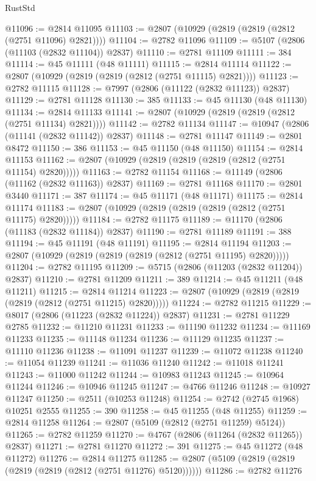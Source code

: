 \begin{lexlean}{RustStd}
\begin{coremodule}
@11096 := @2814 @11095
@11103 := @2807 (@10929 (@2819 (@2819 (@2812 (@2751 @11096) @2821))))
@11104 := @2782 @11096
@11109 := @5107 (@2806 (@11103 (@2832 @11104)) @2837)
@11110 := @2781 @11109
@11111 := 384
@11114 := @45 @11111 (@48 @11111)
@11115 := @2814 @11114
@11122 := @2807 (@10929 (@2819 (@2819 (@2812 (@2751 @11115) @2821))))
@11123 := @2782 @11115
@11128 := @7997 (@2806 (@11122 (@2832 @11123)) @2837)
@11129 := @2781 @11128
@11130 := 385
@11133 := @45 @11130 (@48 @11130)
@11134 := @2814 @11133
@11141 := @2807 (@10929 (@2819 (@2819 (@2812 (@2751 @11134) @2821))))
@11142 := @2782 @11134
@11147 := @10947 (@2806 (@11141 (@2832 @11142)) @2837)
@11148 := @2781 @11147
@11149 := @2801 @8472
@11150 := 386
@11153 := @45 @11150 (@48 @11150)
@11154 := @2814 @11153
@11162 := @2807 (@10929 (@2819 (@2819 (@2819 (@2812 (@2751 @11154) @2820)))))
@11163 := @2782 @11154
@11168 := @11149 (@2806 (@11162 (@2832 @11163)) @2837)
@11169 := @2781 @11168
@11170 := @2801 @3440
@11171 := 387
@11174 := @45 @11171 (@48 @11171)
@11175 := @2814 @11174
@11183 := @2807 (@10929 (@2819 (@2819 (@2819 (@2812 (@2751 @11175) @2820)))))
@11184 := @2782 @11175
@11189 := @11170 (@2806 (@11183 (@2832 @11184)) @2837)
@11190 := @2781 @11189
@11191 := 388
@11194 := @45 @11191 (@48 @11191)
@11195 := @2814 @11194
@11203 := @2807 (@10929 (@2819 (@2819 (@2819 (@2812 (@2751 @11195) @2820)))))
@11204 := @2782 @11195
@11209 := @5715 (@2806 (@11203 (@2832 @11204)) @2837)
@11210 := @2781 @11209
@11211 := 389
@11214 := @45 @11211 (@48 @11211)
@11215 := @2814 @11214
@11223 := @2807 (@10929 (@2819 (@2819 (@2819 (@2812 (@2751 @11215) @2820)))))
@11224 := @2782 @11215
@11229 := @8017 (@2806 (@11223 (@2832 @11224)) @2837)
@11231 := @2781 @11229 @2785
@11232 := @11210 @11231
@11233 := @11190 @11232
@11234 := @11169 @11233
@11235 := @11148 @11234
@11236 := @11129 @11235
@11237 := @11110 @11236
@11238 := @11091 @11237
@11239 := @11072 @11238
@11240 := @11054 @11239
@11241 := @11036 @11240
@11242 := @11018 @11241
@11243 := @11000 @11242
@11244 := @10983 @11243
@11245 := @10964 @11244
@11246 := @10946 @11245
@11247 := @4766 @11246
@11248 := @10927 @11247
@11250 := @2511 (@10253 @11248)
@11254 := @2742 (@2745 @1968) @10251 @2555
@11255 := 390
@11258 := @45 @11255 (@48 @11255)
@11259 := @2814 @11258
@11264 := @2807 (@5109 (@2812 (@2751 @11259) @5124))
@11265 := @2782 @11259
@11270 := @4767 (@2806 (@11264 (@2832 @11265)) @2837)
@11271 := @2781 @11270
@11272 := 391
@11275 := @45 @11272 (@48 @11272)
@11276 := @2814 @11275
@11285 := @2807 (@5109 (@2819 (@2819 (@2819 (@2819 (@2812 (@2751 @11276) @5120))))))
@11286 := @2782 @11276

\end{coremodule}
\end{lexlean}
